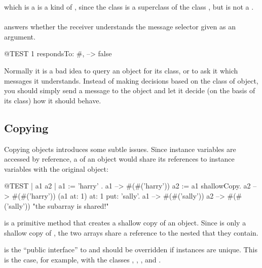 \documentclass[a4paper,10pt,twoside]{book}
\begin{document}
 which is a  is a kind of , since the class  is a superclass of the class , but  is not a .

\paragraph{}
 answers whether the receiver understands the message selector given as an argument.

\begin{code}{@TEST}
1 respondsTo: #, --> false
\end{code}

Normally it is a bad idea to query an object for its class, or to ask it which messages it understands.
Instead of making decisions based on the class of object, you should simply send a message to the object and let it decide (\ie on the basis of its class) how it should behave.

\subsection{Copying}

Copying objects introduces some subtle issues. Since instance variables are accessed by reference, a  of an object would share its references to instance variables with the original object:

\begin{code}{@TEST | a1 a2 |}
a1 := { { 'harry' } }.
a1 --> #(#('harry'))
a2 := a1 shallowCopy.
a2 --> #(#('harry'))
(a1 at: 1) at: 1 put: 'sally'.
a1 --> #(#('sally'))
a2 --> #(#('sally'))    "the subarray is shared!"
\end{code}

 is a primitive method that creates a shallow copy of an object. Since  is only a shallow copy of , the two arrays share a reference to the nested  that they contain.

 is the ``public interface'' to  and should be overridden if instances are unique. This is the case, for example, with the classes , , ,  and .
\end{document}
